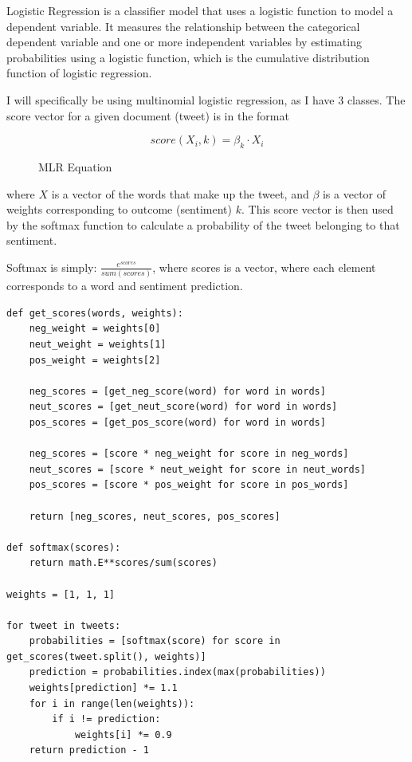 \documentclass{article}
\begin{document}
Logistic Regression is a classifier model that uses a logistic function to model a dependent variable.
It measures the relationship between the categorical dependent variable and one or more independent variables by estimating probabilities using a logistic function, which is the cumulative distribution function of logistic regression.

I will specifically be using multinomial logistic regression, as I have 3 classes.
The score vector for a given document (tweet) is in the format

\begin{figure}[H]
	\begin{equation}
		score(X_i, k) = \beta_k \cdot X_i
	\end{equation}
	\caption{MLR Equation}
\end{figure}

where $X$ is a vector of the words that make up the tweet, and $\beta$ is a vector of weights corresponding to outcome (sentiment) $k$.
This score vector is then used by the softmax function to calculate a probability of the tweet belonging to that sentiment.

Softmax is simply: $\frac{e^{scores}}{sum(scores)}$, where scores is a vector, where each element corresponds to a word and sentiment prediction.

\begin{lstlisting}[caption={Multinomial Logistic Regression classifier psuedopythoncode},captionpos=b]
def get_scores(words, weights):
	neg_weight = weights[0]
	neut_weight = weights[1]
	pos_weight = weights[2]

	neg_scores = [get_neg_score(word) for word in words]
	neut_scores = [get_neut_score(word) for word in words]
	pos_scores = [get_pos_score(word) for word in words]

	neg_scores = [score * neg_weight for score in neg_words]
	neut_scores = [score * neut_weight for score in neut_words]
	pos_scores = [score * pos_weight for score in pos_words]

	return [neg_scores, neut_scores, pos_scores]

def softmax(scores):
	return math.E**scores/sum(scores)

weights = [1, 1, 1]

for tweet in tweets:
	probabilities = [softmax(score) for score in get_scores(tweet.split(), weights)]
	prediction = probabilities.index(max(probabilities))
	weights[prediction] *= 1.1
	for i in range(len(weights)):
		if i != prediction:
			weights[i] *= 0.9
	return prediction - 1
\end{lstlisting}
\end{document}
